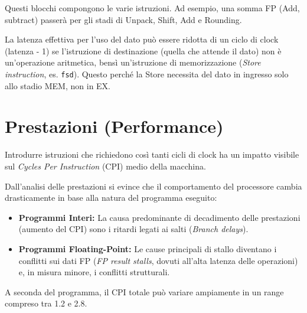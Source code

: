 Questi blocchi compongono le varie istruzioni. Ad esempio, una somma FP (Add, subtract) passerà per gli stadi di Unpack, Shift, Add e Rounding. 

\begin{remark}
La latenza effettiva per l'uso del dato può essere ridotta di un ciclo di clock (latenza - 1) se l'istruzione di destinazione (quella che attende il dato) non è un'operazione aritmetica, bensì un'istruzione di memorizzazione (\textit{Store instruction}, es. \texttt{fsd}). Questo perché la Store necessita del dato in ingresso solo allo stadio MEM, non in EX.
\end{remark}

\section{Prestazioni (Performance)}
Introdurre istruzioni che richiedono così tanti cicli di clock ha un impatto visibile sul \textit{Cycles Per Instruction} (CPI) medio della macchina.


Dall'analisi delle prestazioni si evince che il comportamento del processore cambia drasticamente in base alla natura del programma eseguito:
\begin{itemize}
    \item \textbf{Programmi Interi:} La causa predominante di decadimento delle prestazioni (aumento del CPI) sono i ritardi legati ai salti (\textit{Branch delays}).
    \item \textbf{Programmi Floating-Point:} Le cause principali di stallo diventano i conflitti sui dati FP (\textit{FP result stalls}, dovuti all'alta latenza delle operazioni) e, in misura minore, i conflitti strutturali.
\end{itemize}
A seconda del programma, il CPI totale può variare ampiamente in un range compreso tra 1.2 e 2.8.